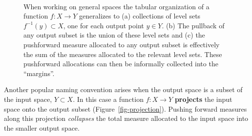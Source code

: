 \documentclass[
  letterpaper,
  DIV=11,
  numbers=noendperiod]{scrartcl}
\begin{document}
\begin{figure}
\begin{minipage}[t]{0.32\linewidth}
{{}

}

\subcaption{\label{fig-pullback-sets}}
\end{minipage}%
%
\begin{minipage}[t]{0.32\linewidth}

{\centering 


}

\subcaption{\label{fig-marginal-probability}}
\end{minipage}%
%
\begin{minipage}[t]{0.02\linewidth}

{\centering 

~

}

\end{minipage}%

\caption{\label{fig-continuous-marginal}When working on general spaces
the tabular organization of a function \(f: X \rightarrow Y\)
generalizes to (a) collections of level sets \(f^{-1}(y) \subset X\),
one for each output point \(y \in Y\). (b) The pullback of any output
subset is the union of these level sets and (c) the pushforward measure
allocated to any output subset is effectively the sum of the measures
allocated to the relevant level sets. These pushforward allocations can
then be informally collected into the ``margins''.}

\end{figure}

Another popular naming convention arises when the output space is a
subset of the input space, \(Y \subset X\). In this case a function
\(f: X \rightarrow Y\) \textbf{projects} the input space onto the output
subset (Figure~\ref{fig-projection}). Pushing forward measures along
this projection \emph{collapses} the total measure allocated to the
input space into the smaller output space.
\end{document}
